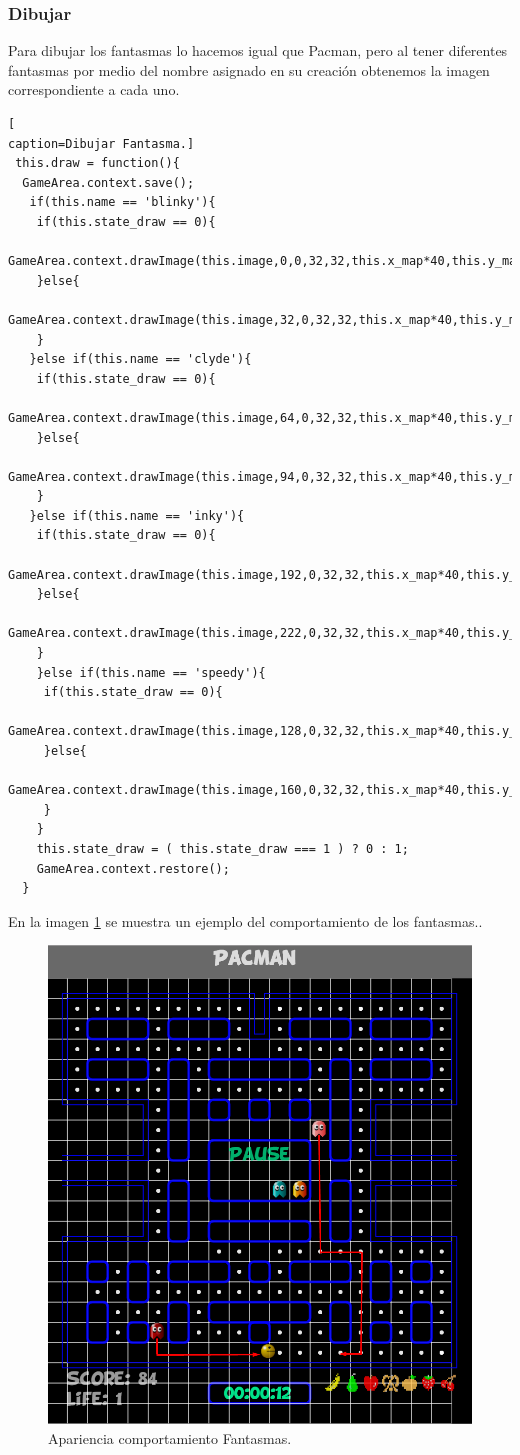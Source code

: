 \subsubsection*{Dibujar}
Para dibujar los fantasmas lo hacemos igual que Pacman, pero al tener diferentes fantasmas por medio del nombre asignado en su creación obtenemos la imagen correspondiente a cada uno. 
\begin{lstlisting}[
caption=Dibujar Fantasma.]
 this.draw = function(){
  GameArea.context.save();
   if(this.name == 'blinky'){
    if(this.state_draw == 0){
     GameArea.context.drawImage(this.image,0,0,32,32,this.x_map*40,this.y_map*40,35,35);
    }else{
     GameArea.context.drawImage(this.image,32,0,32,32,this.x_map*40,this.y_map*40,35,35);
    }		
   }else if(this.name == 'clyde'){
    if(this.state_draw == 0){
     GameArea.context.drawImage(this.image,64,0,32,32,this.x_map*40,this.y_map*40,35,35);
    }else{
     GameArea.context.drawImage(this.image,94,0,32,32,this.x_map*40,this.y_map*40,35,35);
    }
   }else if(this.name == 'inky'){
    if(this.state_draw == 0){
     GameArea.context.drawImage(this.image,192,0,32,32,this.x_map*40,this.y_map*40,35,35);
    }else{
     GameArea.context.drawImage(this.image,222,0,32,32,this.x_map*40,this.y_map*40,35,35);
    }
    }else if(this.name == 'speedy'){
     if(this.state_draw == 0){
      GameArea.context.drawImage(this.image,128,0,32,32,this.x_map*40,this.y_map*40,35,35);
     }else{
      GameArea.context.drawImage(this.image,160,0,32,32,this.x_map*40,this.y_map*40,35,35);
     }
    }
    this.state_draw = ( this.state_draw === 1 ) ? 0 : 1;
    GameArea.context.restore();
  }
\end{lstlisting}
En la imagen \ref{fig:DrawGhost} se muestra un ejemplo del comportamiento de los fantasmas..
\begin{figure}[!h]
\centering
\includegraphics[width=0.4\linewidth]{Figures/SeguimientoGhost}
\decoRule
\caption[Apariencia comportamiento Fantasmas]{Apariencia comportamiento Fantasmas.}
\label{fig:DrawGhost}
\end{figure}
